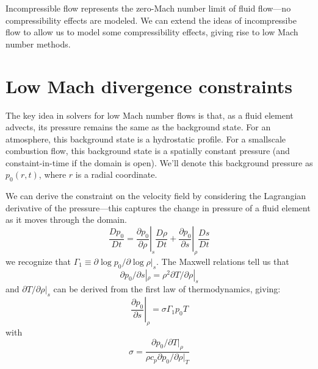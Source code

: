 \newcommand{\teta}{\tilde{\eta}}

Incompressible flow represents the zero-Mach number limit of fluid
flow---no compressibility effects are modeled.  We can extend the
ideas of incompressibe flow to allow us to model some compressibility
effects, giving rise to low Mach number methods.

\section{Low Mach divergence constraints}

The key idea in solvers for low Mach number flows is that, as a fluid
element advects, its pressure remains the same as the background
state.  For an atmosphere, this background state is a hydrostatic
profile.  For a smallscale combustion flow, this background state is a
spatially constant pressure (and constaint-in-time if the domain is
open).  We'll denote this background pressure as $p_0(r,t)$, where 
$r$ is a radial coordinate.

We can derive the constraint on the velocity field by considering the
Lagrangian derivative of the pressure---this captures the change in
pressure of a fluid element as it moves through the domain.
\begin{equation}
\frac{Dp_0}{Dt} = \left . \frac{\partial p_0}{\partial \rho} \right |_s
     \frac{D\rho}{Dt} +
     \left . \frac{\partial p_0}{\partial s} \right |_\rho
     \frac{Ds}{Dt}
\end{equation}
we recognize that $\Gamma_1 \equiv \partial \log p_0/\partial \log \rho |_s$.
The Maxwell relations tell us that
\begin{equation}
\partial p_0/\partial s |_\rho = \rho^2 \partial T/\partial \rho |_s
\end{equation}
and $\partial T/\partial \rho |_s$ can be derived from the first law
of thermodynamics, giving:
\begin{equation}
\left . \frac{\partial p_0}{\partial s} \right |_\rho 
= \sigma \Gamma_1 p_0 T
\end{equation}
with 
\begin{equation}
\sigma = \frac{\partial p_0/\partial T |_\rho}{\rho c_p \partial p_0/\partial \rho |_T}
\end{equation}

